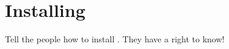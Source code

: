 \section{Installing \otsdaq}
\label{sec:installation}

Tell the people how to install \otsdaq. They have a right to know!
